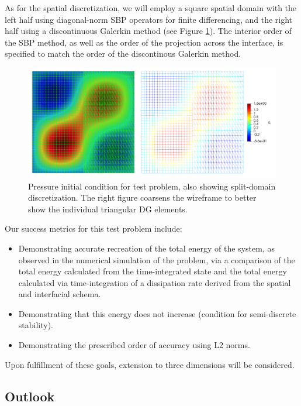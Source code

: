 As for the spatial discretization, we will employ a square spatial domain
with the left half using diagonal-norm SBP operators for finite differencing,
and the right half using a discontinuous Galerkin method (see Figure \ref{fig:split_domain}). The interior order
of the SBP method, as well as the order of the projection across the interface,
is specified to match the order of the discontinous Galerkin method.
\begin{figure}
\centering
\includegraphics[width=0.9\linewidth,trim=4 4 4 4,clip]{figures/split_domain_wave_double.png}
\caption{Pressure initial condition for test problem, also showing split-domain
	 discretization. The right figure coarsens the wireframe to better show the
	 individual triangular DG elements.}
\label{fig:split_domain}
\end{figure}
Our success metrics for this test problem include:
\begin{itemize}
\item{Demonstrating accurate recreation of the total energy of the system, as observed in the
      numerical simulation of the problem, via a comparison of the total energy calculated from the
      time-integrated state and the total energy calculated via time-integration of a dissipation rate
      derived from the spatial and interfacial schema.}
\item{Demonstrating that this energy does not increase (condition for semi-discrete stability).}
\item{Demonstrating the prescribed order of accuracy using L2 norms.}
\end{itemize}
Upon fulfillment of these goals, extension to three dimensions will be considered.

\subsection{Outlook}

